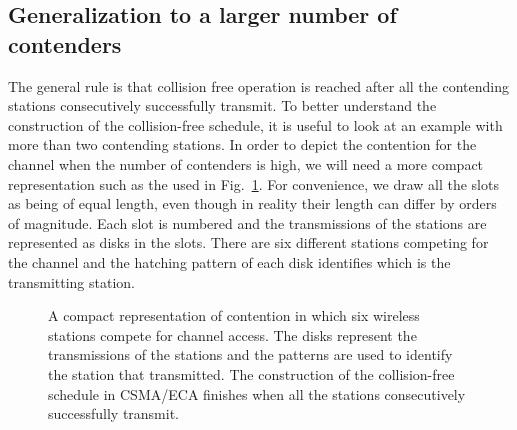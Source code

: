 \documentclass[journal]{IEEEtran}
\begin{document}
\subsection{Generalization to a larger number of contenders}
The general rule is that collision free operation is reached after all the contending stations consecutively successfully transmit.
To better understand the construction of the collision-free schedule, it is useful to look at an example with more than two contending stations.
In order to depict the contention for the channel when the number of contenders is high, we will need a more compact representation such as the used in Fig.~\ref{fig:ca_vs_eca_compact}.
For convenience, we draw all the slots as being of equal length, even though in reality their length can differ by orders of magnitude.
Each slot is numbered and the transmissions of the stations are represented as disks in the slots.
There are six different stations competing for the channel and the hatching pattern of each disk identifies which is the transmitting station.

\begin{figure}[!t]
\centering
{}
\caption{A compact representation of contention in which six wireless stations compete for channel access. The disks represent the transmissions of the stations and the  patterns are used to identify the station that transmitted. The construction of the collision-free schedule in CSMA/ECA finishes when all the stations consecutively successfully transmit.}
\label{fig:ca_vs_eca_compact}
\end{figure}
\end{document}
